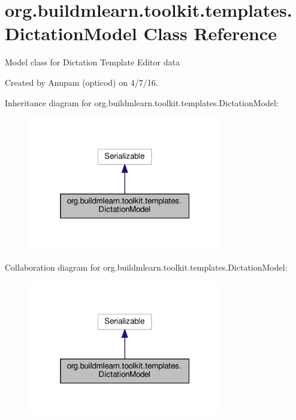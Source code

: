 \hypertarget{classorg_1_1buildmlearn_1_1toolkit_1_1templates_1_1DictationModel}{}\section{org.\+buildmlearn.\+toolkit.\+templates.\+Dictation\+Model Class Reference}
\label{classorg_1_1buildmlearn_1_1toolkit_1_1templates_1_1DictationModel}


Model class for Dictation Template Editor data 

Created by Anupam (opticod) on 4/7/16.  




Inheritance diagram for org.\+buildmlearn.\+toolkit.\+templates.\+Dictation\+Model\+:
\nopagebreak
\begin{figure}[H]
\begin{center}
\leavevmode
\includegraphics[width=241pt]{classorg_1_1buildmlearn_1_1toolkit_1_1templates_1_1DictationModel__inherit__graph}
\end{center}
\end{figure}


Collaboration diagram for org.\+buildmlearn.\+toolkit.\+templates.\+Dictation\+Model\+:
\nopagebreak
\begin{figure}[H]
\begin{center}
\leavevmode
\includegraphics[width=241pt]{classorg_1_1buildmlearn_1_1toolkit_1_1templates_1_1DictationModel__coll__graph}
\end{center}
\end{figure}
